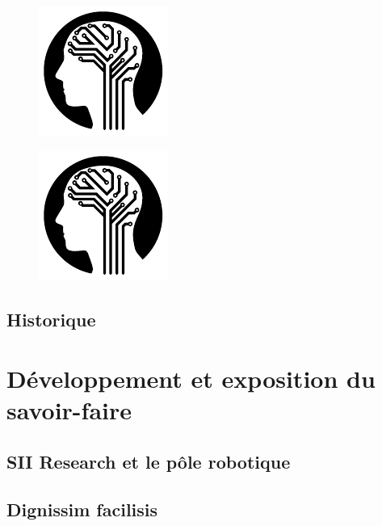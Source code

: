 			\begin{figure}
				\centering
				\begin{minipage}{.5\textwidth}
					\centering
					\includegraphics[page=1,width=0.7\linewidth]{figures/test.pdf}
					\label{fig:Test2}
				\end{minipage}%
				\begin{minipage}{.5\textwidth}
					\centering
					\includegraphics[page=1,width=0.7\linewidth]{figures/test.pdf}
					\label{fig:Test3}
				\end{minipage}
			\end{figure}
						
		\subsection{Historique}
		
			\lipsum[4-6]

	\section{Développement et exposition du savoir-faire}
	
		\subsection{SII Research et le pôle robotique}
		
			\lipsum[6-9]
			
		\subsection{Dignissim facilisis}
		
			\lipsum[10-12]
			
